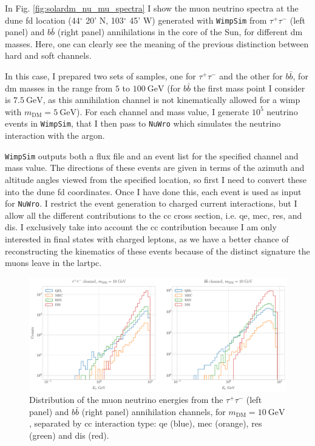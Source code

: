 In Fig. \ref{fig:solardm_nu_mu_spectra} I show the muon neutrino spectra at the \gls{dune} \gls{fd} location (44$^{\circ} $ 20' N, 103$^{\circ} $ 45' W) generated with \texttt{WimpSim} \cite{WimpSim} from $\tau^{+} \tau^{-}$ (left panel) and $b\bar{b}$ (right panel) annihilations in the core of the Sun, for different \gls{dm} masses. Here, one can clearly see the meaning of the previous distinction between hard and soft channels.

In this case, I prepared two sets of samples, one for $\tau^{+} \tau^{-}$ and the other for $b\bar{b}$, for \gls{dm} masses in the range from $5$ to $100 \ \mathrm{GeV}$ (for $b\bar{b}$ the first mass point I consider is $7.5 \ \mathrm{GeV}$, as this annihilation channel is not kinematically allowed for a \gls{wimp} with $m_{\mathrm{DM}}=5 \ \mathrm{GeV}$). For each channel and mass value, I generate $10^{5}$ neutrino events in \texttt{WimpSim}, that I then pass to \texttt{NuWro} which simulates the neutrino interaction with the argon.

\texttt{WimpSim} outputs both a flux file and an event list for the specified channel and mass value. The directions of these events are given in terms of the azimuth and altitude angles viewed from the specified location, so first I need to convert these into the \gls{dune} \gls{fd} coordinates. Once I have done this, each event is used as input for \texttt{NuWro}. I restrict the event generation to charged current interactions, but I allow all the different contributions to the \gls{cc} cross section, i.e. \gls{qe}, \gls{mec}, \gls{res}, and \gls{dis}. I exclusively take into account the \gls{cc} contribution because I am only interested in final states with charged leptons, as we have a better chance of reconstructing the kinematics of these events because of the distinct signature the muons leave in the \gls{lartpc}.

\begin{figure}[t]
	\centering
	\includegraphics[width=1\linewidth]{Images/DM_Analysis/solardm_nu_mu_interactions.pdf}
	\caption[Distribution of the muon neutrino energies from the $\tau^{+} \tau^{-}$ and $b\bar{b}$ annihilation channels.]{Distribution of the muon neutrino energies from the $\tau^{+} \tau^{-}$ (left panel) and $b\bar{b}$ (right panel) annihilation channels, for $m_{\mathrm{DM}} = 10 \ \mathrm{GeV}$, separated by \gls{cc} interaction type: \gls{qe} (blue), \gls{mec} (orange), \gls{res} (green) and \gls{dis} (red).}
	\label{fig:solardm_nu_mu_interactions}
\end{figure}

